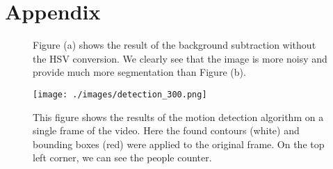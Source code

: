 \documentclass[runningheads]{llncs}
\begin{document}






\section*{Appendix}

\begin{figure}
\centering
{}
\hspace{0.01\linewidth}%
\caption{Figure (a) shows the result of the background subtraction without the HSV conversion. We clearly see that the image
is more noisy and provide much more segmentation than Figure (b).}
\label{object_detection}
\end{figure}

\begin{figure}
\texttt{[image: ./images/detection\_300.png]}
\caption{This figure shows the results of the motion detection algorithm on a single frame of the video. Here the found contours (white) and bounding boxes (red) were applied to the original frame. On the top left corner, we can see the people counter.}
\label{object_detection_result}
\end{figure}
\end{document}
